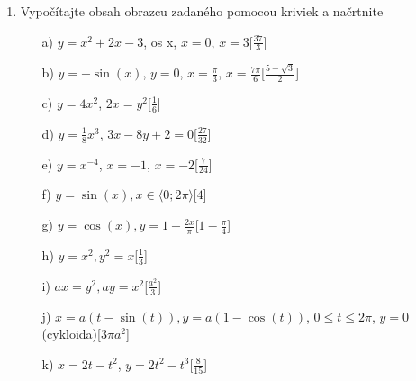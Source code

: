 \begin{enumerate}
\begin{enumerate}
\item[d)]{$\int_0^1\frac{e^{x}}{1+e^{x}}\,dx$}\hspace{\fill}[$\ln(\frac{1 + e}{2})$]
\item[e)]{$\int_{\frac{\pi}{6}}^{\frac{\pi}{3}}\frac{\sin(2x)}{\cos(x)}\,dx$}\hspace{\fill}[$\sqrt{3} - 1$]
\item[f)]{$\int_0^2 |1-x|\,dx$}\hspace{\fill}[$1$]
\item[g)]{$\int_{-1}^{1}\frac{dx}{x}$}\hspace{\fill}[Nelze použít formule, funkce nesplňuje předpoklady v $x=0$]
\end{enumerate}

\item Vypočítajte obsah obrazcu zadaného pomocou kriviek a načrtnite

\begin{enumerate}
\item[a)]{$y=x^2+2x-3$, os x, $x=0$, $x=3$}\hspace{\fill}[$\frac{37}{3}$]
\item[b)]{$y=-\sin(x)$, $y=0$, $x=\frac{\pi}{3}$, $x=\frac{7 \pi}{6}$}\hspace{\fill}[$\frac{5-\sqrt{3}}{2}$]
\item[c)]{$y=4x^2$, $2x=y^2$}\hspace{\fill}[$\frac{1}{6}$]
\item[d)]{$y=\frac{1}{8}x^3$, $3x-8y+2=0$}\hspace{\fill}[$\frac{27}{32}$]
\item[e)]{$y=x^{-4}$, $x=-1$, $x=-2$}\hspace{\fill}[$\frac{7}{24}$]

\item[f)]{$y=\sin(x), x \in \langle 0;2\pi \rangle$}\hspace{\fill}[$4$]
\item[g)]{$y=\cos(x), y=1-\frac{2x}{\pi}$}\hspace{\fill}[$1-\frac{\pi}{4}$]
\item[h)]{$y=x^2, y^2=x$}\hspace{\fill}[$\frac{1}{3}$]
\item[i)]{$ax=y^2, ay=x^2$}\hspace{\fill}[$\frac{a^2}{3}$]
\item[j)]{$x=a(t-\sin(t)), y=a(1-\cos(t))$, $0 \leq t \leq 2\pi$, $y=0$ (cykloida)}\hspace{\fill}[$3\pi a^2$]
\item[k)]{$x=2t-t^2$, $y=2t^2-t^3$}\hspace{\fill}[$\frac{8}{15}$]
\end{enumerate}


\end{enumerate}
